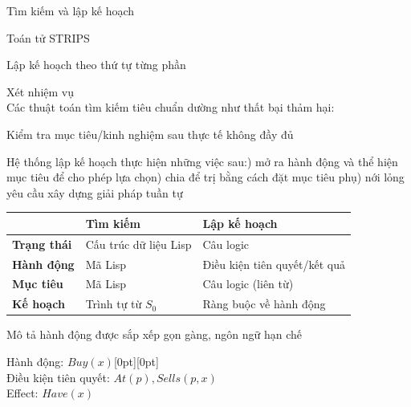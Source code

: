 \documentclass{article}
\begin{document}
\begin{huge}

\sf


\blob Tìm kiếm và lập kế hoạch

\blob Toán tử STRIPS

\blob Lập kế hoạch theo thứ tự từng phần



Xét nhiệm vụ \\
Các thuật toán tìm kiếm tiêu chuẩn dường như thất bại thảm hại:

\vspace*{0.1in}

\textwidth
{}

Kiểm tra mục tiêu/kinh nghiệm sau thực tế không đầy đủ




Hệ thống lập kế hoạch thực hiện những việc sau:) mở ra hành động và thể hiện mục tiêu để cho phép lựa chọn) chia để trị bằng cách đặt mục tiêu phụ) nới lỏng yêu cầu xây dựng giải pháp tuần tự

\begin{tabular}{l|l|l}
              & {\bf Tìm kiếm} & {\bf Lập kế hoạch} \\
\hline
{\bf Trạng thái} & Cấu trúc dữ liệu Lisp & Câu logic \\
{\bf Hành động} & Mã Lisp & Điều kiện tiên quyết/kết quả \\
{\bf Mục tiêu} & Mã Lisp & Câu logic (liên từ)\\
{\bf Kế hoạch} & Trình tự từ $S_0$ & Ràng buộc về hành động
\end{tabular}



Mô tả hành động được sắp xếp gọn gàng, ngôn ngữ hạn chế

{\sc Hành động}: $Buy(x)$\hfill{}\textwidth\raisebox{-1.5in}[0pt][0pt]{}\\
{\sc Điều kiện tiên quyết}: $At(p), Sells(p,x)$\\
{\sc Effect}: $Have(x)$


\end{huge}
\end{document}
